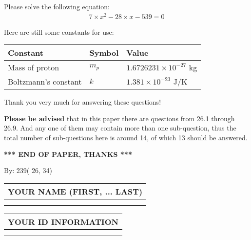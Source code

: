\documentclass[12pt]{article}
\begin{document}
  
 
 

 
Please solve the following equation:
\begin{eqnarray*}
7 \times x^2  %
-28
                 \times x    %
-539 =0
\end{eqnarray*}
 

 

 
\vspace{0.3in}
   
   
 \vspace{0.2in}
Here are still some constants for use:
 
 
\noindent\begin{tabular}{|l|l|l|}
\hline
Constant & Symbol & Value \\
\hline
 
Mass of proton &
$m_p$ &
 $ 1.6726231 \times 10^{-27} $
kg \\
\hline
 
Boltzmann's constant &
$k$ &
 $ 1.381 \times 10^{-23} $
J/K \\
\hline
 
\end{tabular}
 
Thank you very much for answering these questions!
 
{\textbf{\large{Please be advised}}} that in this paper there are questions from
26.1 through
26.9.
And any one of them may contain more than one sub-question, thus the total number
of sub-questions here is around 14, of which
13 should be answered.
 
   
   
   
   
\vspace{1.0in} 
{\textbf{\large{ *** END OF PAPER, THANKS *** }}} 
   
   
\hspace{1.0in} By: 
         239(         26,          34)
   
   
   
   
\newpage 
\setcounter{page}{ 
    27001 } 
   
   
   
   
\noindent\begin{tabular}{|l|}
\hline
YOUR NAME (FIRST, ... LAST)  \\
\hline
 \\ 
 \\ 
\hline
\end{tabular}
\hspace{0.05in} \begin{tabular}{|l|}
\hline
 YOUR   ID   INFORMATION  \\
\hline
 \\ 
 \\ 
\hline
\end{tabular}
   
\end{document}
